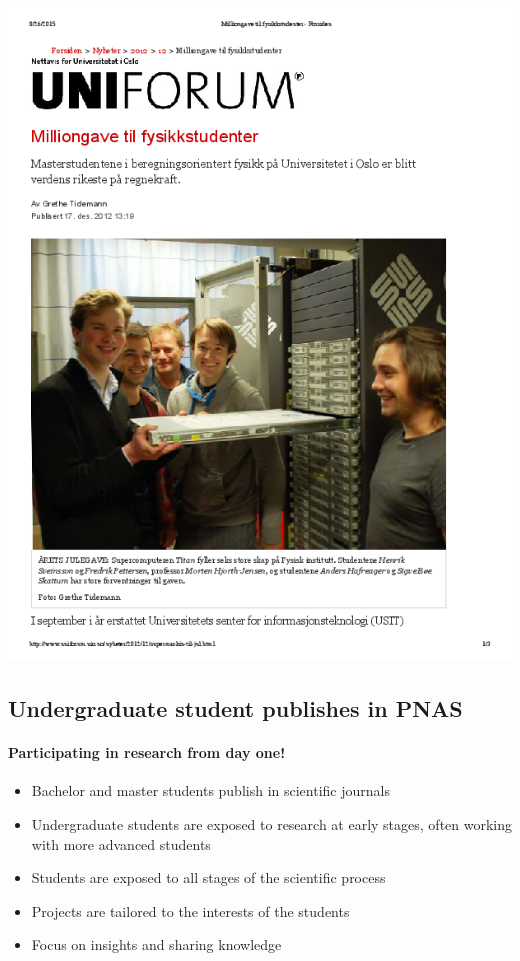 \documentclass[%
twoside,                 %
final,                   %
10pt]{article}
\begin{document}
\noindent





\centerline{\includegraphics[width=1.0\linewidth]{fig-future/uniforum-0.png}}




\subsection{Undergraduate student publishes in PNAS}

\paragraph{Participating in research from day one!}
\begin{itemize}
\item Bachelor and master students publish in scientific journals 

\item Undergraduate students are exposed to research at early stages, often working with more advanced students

\item Students are exposed to all stages of the scientific process

\item Projects are tailored to the interests of the students

\item Focus on insights and sharing knowledge
\end{itemize}
\end{document}
